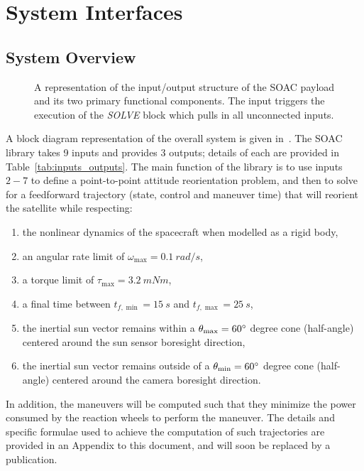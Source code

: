 \documentclass[10pt]{article}
\begin{document}
\section{System Interfaces}\label{sec:interfaces}

\subsection{System Overview}\label{sec2:sys_overview} 

\begin{figure}[tbh]
\centering

\caption{A representation of the input/output structure of the SOAC payload and its two primary functional components. The input  triggers the execution of the \textit{SOLVE} block which pulls in all unconnected inputs.}
\label{fig:soac_inner}
\end{figure}

A block diagram representation of the overall system is given in~. The SOAC library takes 9 inputs and provides 3 outputs; details of each are provided in Table~\ref{tab:inputs_outputs}. The main function of the library is to use inputs $2-7$ to define a point-to-point attitude reorientation problem, and then to solve for a feedforward trajectory (state, control and maneuver time) that will reorient the satellite while respecting:
\begin{enumerate}
\item the nonlinear dynamics of the spacecraft when modelled as a rigid body,
\item an angular rate limit of $\omega_{\max} = 0.1~\unit{rad/s}$,
\item a torque limit of $\tau_{\max} = 3.2~\unit{mNm}$,
\item a final time between $t_{f,\min}=15~\unit{s}$ and $t_{f,\max}=25~\unit{s}$,
\item the inertial sun vector remains within a $\theta_{\max}=60\mathrm{^{\circ}}$ degree cone (half-angle) centered around the sun sensor boresight direction,
\item the inertial sun vector remains outside of a $\theta_{\min}=60\mathrm{^{\circ}}$ degree cone (half-angle) centered around the camera boresight direction. 
\end{enumerate}
In addition, the maneuvers will be computed such that they minimize the power consumed by the reaction wheels to perform the maneuver. The details and specific formulae used to achieve the computation of such trajectories are provided in an Appendix to this document, and will soon be replaced by a publication. 
\end{document}
